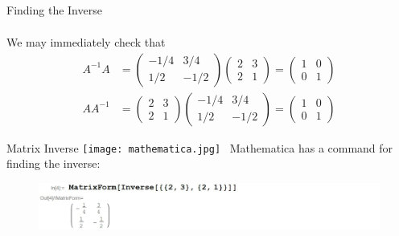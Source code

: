 \documentclass[smaller,hyperref={CJKbookmarks=true}]{beamer}
\begin{document}
\begin{frame}{Finding the Inverse}
\begin{spacing}{1.1}
\begin{equation*}
\begin{array}{c|c}
\end{array}
\end{equation*}
We may immediately check that
\begin{align*}
  A^{-1}A &=\begin{pmatrix}
                                -1/4 & 3/4 \\
                                1/2 & -1/2
                              \end{pmatrix}\begin{pmatrix}
    2 & 3 \\
    2 & 1
  \end{pmatrix}=\begin{pmatrix}
                  1 & 0 \\
                  0 & 1
                \end{pmatrix} \\
  AA^{-1} &=\begin{pmatrix}
    2 & 3 \\
    2 & 1
  \end{pmatrix}\begin{pmatrix}
                                -1/4 & 3/4 \\
                                1/2 & -1/2
                              \end{pmatrix}=\begin{pmatrix}
                  1 & 0 \\
                  0 & 1
                \end{pmatrix}
\end{align*}
\end{spacing}
\end{frame}
\begin{frame}[t]{Matrix Inverse}
\texttt{[image: mathematica.jpg]}~ Mathematica has a command for finding the inverse:
\begin{figure}
  \centering
  \includegraphics[width=\textwidth]{27.jpg}

\end{figure}
\end{frame}
\end{document}
